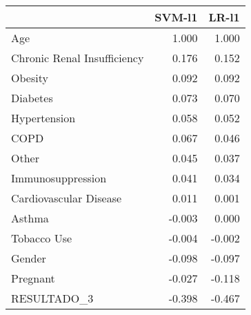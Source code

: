\begin{tabular}{lrr}
\toprule
{} &  SVM-l1 &  LR-l1 \\
\midrule
Age                         &   1.000 &  1.000 \\
Chronic Renal Insufficiency &   0.176 &  0.152 \\
Obesity                     &   0.092 &  0.092 \\
Diabetes                    &   0.073 &  0.070 \\
Hypertension                &   0.058 &  0.052 \\
COPD                        &   0.067 &  0.046 \\
Other                       &   0.045 &  0.037 \\
Immunosuppression           &   0.041 &  0.034 \\
Cardiovascular Disease      &   0.011 &  0.001 \\
Asthma                      &  -0.003 &  0.000 \\
Tobacco Use                 &  -0.004 & -0.002 \\
Gender                      &  -0.098 & -0.097 \\
Pregnant                    &  -0.027 & -0.118 \\
RESULTADO\_3                 &  -0.398 & -0.467 \\
\bottomrule
\end{tabular}

